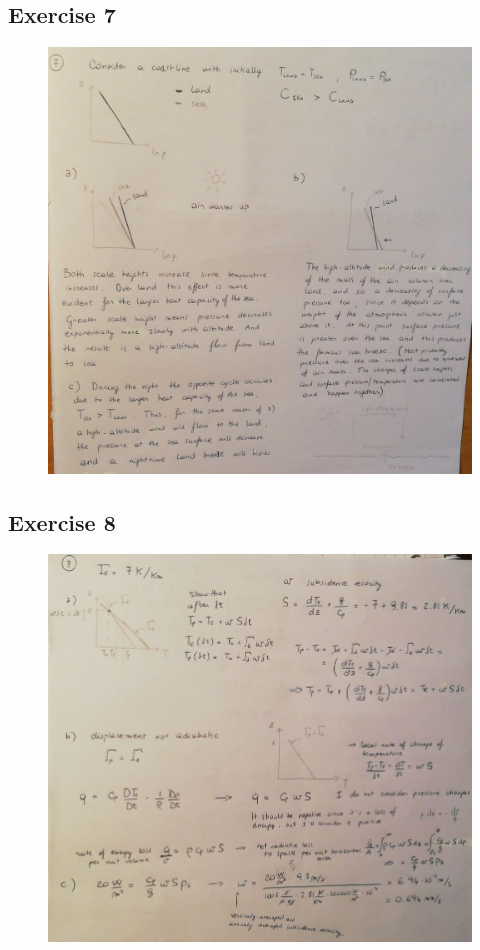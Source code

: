 \documentclass[11pt,a4paper]{article}
\begin{document}
\subsection{Exercise 7}
\begin{figure}[H]
	\centering \includegraphics[width=150mm]{images/es7.JPEG}
\end{figure}
\subsection{Exercise 8}
\begin{figure}[H]
	\centering \includegraphics[width=150mm]{images/es8.JPEG}
\end{figure}
\end{document}

